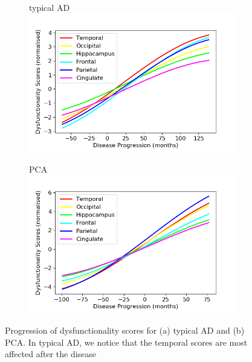 \documentclass{llncs}
\begin{document}
\begin{figure}[H]
\begin{subfigure}{0.47\textwidth}
\centering
typical AD\\
\includegraphics[width=\textwidth, trim=0 0 0 20, clip]{figures/tAD_trajSameSpace_tad-drcTinyPen1_JMD.png} 
\caption{}
\end{subfigure}
\begin{subfigure}{0.47\textwidth}
\centering
PCA\\
\includegraphics[width=\textwidth, trim=0 0 0 20, clip]{figures/PCA_trajSameSpace_tad-drcTinyPen1_JMD.png} 
\caption{}
\end{subfigure}
\caption{Progression of dysfunctionality scores for (a) typical AD and (b) PCA. In typical AD, we notice that the temporal scores are most affected after the disease }
\label{fig:pcaTadDisSpace}
\end{figure}
\end{document}
